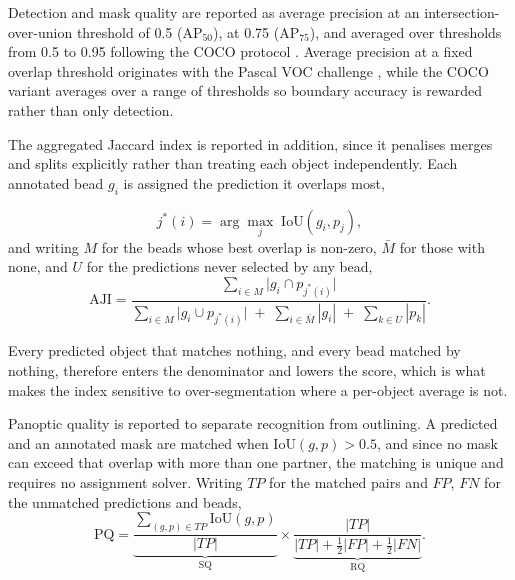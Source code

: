 Detection and mask quality are reported as average precision at an
intersection-over-union threshold of 0.5 ($\mathrm{AP}_{50}$), at 0.75
($\mathrm{AP}_{75}$), and averaged over thresholds from 0.5 to 0.95 following the
COCO protocol \cite{lin2014microsoft}. Average precision at a fixed overlap
threshold originates with the Pascal VOC challenge \cite{everingham2010pascal},
while the COCO variant averages over a range of thresholds so boundary accuracy is
rewarded rather than only detection.

The aggregated Jaccard index \cite{kumar2017dataset} is reported in addition,
since it penalises merges and splits explicitly rather than treating each object
independently. Each annotated bead $g_i$ is assigned the prediction it overlaps
most,
%

\begin{equation}
    j^{*}(i) = \arg\max_{j} \; \mathrm{IoU}(g_i, p_j),
    \label{eq:aji_match}
\end{equation}
%
and writing $M$ for the beads whose best overlap is non-zero, $\bar{M}$ for those
with none, and $U$ for the predictions never selected by any bead,
%
\begin{equation}
    \mathrm{AJI} =
    \frac{\displaystyle\sum_{i \in M} \bigl|g_i \cap p_{j^{*}(i)}\bigr|}
         {\displaystyle\sum_{i \in M} \bigl|g_i \cup p_{j^{*}(i)}\bigr|
          \;+\; \sum_{i \in \bar{M}} |g_i|
          \;+\; \sum_{k \in U} |p_k|}.
    \label{eq:aji}
\end{equation}

%
Every predicted object that matches nothing, and every bead matched by nothing,
therefore enters the denominator and lowers the score, which is what makes the
index sensitive to over-segmentation where a per-object average is not.

Panoptic quality \cite{kirillov2019panoptic} is reported to separate
recognition from outlining. A predicted and an annotated mask are matched when
$\mathrm{IoU}(g, p) > 0.5$, and since no mask can exceed that overlap with more than
one partner, the matching is unique and requires no assignment solver. Writing
$\mathit{TP}$ for the matched pairs and $\mathit{FP}$, $\mathit{FN}$ for the
unmatched predictions and beads,
%
\begin{equation}
    \mathrm{PQ} =
    \underbrace{\frac{\sum_{(g,p) \in \mathit{TP}} \mathrm{IoU}(g,p)}
                     {|\mathit{TP}|}}_{\textstyle \mathrm{SQ}}
    \times
    \underbrace{\frac{|\mathit{TP}|}
                     {|\mathit{TP}| + \tfrac{1}{2}|\mathit{FP}|
                      + \tfrac{1}{2}|\mathit{FN}|}}_{\textstyle \mathrm{RQ}}.
    \label{eq:pq}
\end{equation}

